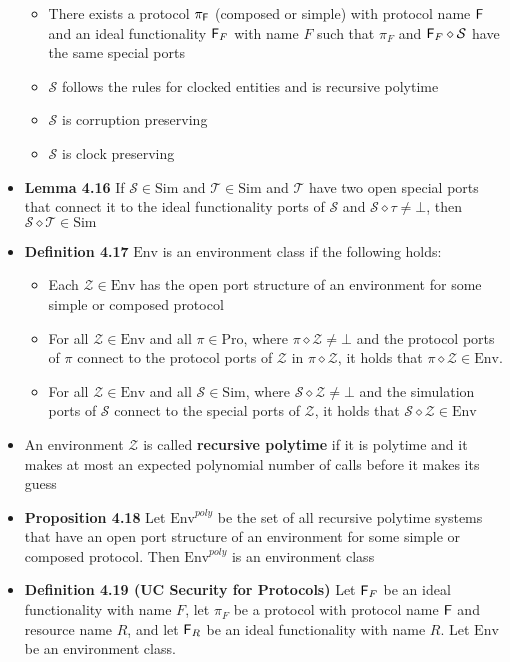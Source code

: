 \begin{itemize}
  \begin{itemize}
  	\item There exists a protocol $\pi_{\mathsf{F}}$ (composed or simple) with protocol name $\mathsf{F}$ and an ideal functionality $\mathsf{F}_{F}$ with name $F$ such that $\pi_{F}$ and $\mathsf{F}_{F} \diamond \mathcal S$ have the same special ports
  	\item $\mathcal S$ follows the rules for clocked entities and is recursive polytime
  	\item $\mathcal S$ is corruption preserving
  	\item $\mathcal S$ is clock preserving
  \end{itemize}
  \item \textbf{Lemma 4.16} If $\mathcal S \in \text{Sim}$ and $\mathcal T \in \text{Sim}$ and $\mathcal T$ have two open special ports that connect it to the ideal functionality ports of $\mathcal S$ and $\mathcal S \diamond \mathcal \tau \neq \bot$, then $\mathcal S \diamond \mathcal T \in \text{Sim}$
  \item \textbf{Definition 4.17} $\text{Env}$ is an environment class if the following holds:
  \begin{itemize}
  	\item Each $\mathcal Z \in \text{Env}$ has the open port structure of an environment for some simple or composed protocol
  	\item For all $\mathcal Z \in \text{Env}$ and all $\pi \in \text{Pro}$, where $\pi \diamond \mathcal Z \neq \bot$ and the protocol ports of $\pi$ connect to the protocol ports of $\mathcal Z$ in $\pi \diamond \mathcal Z$, it holds that $\pi \diamond \mathcal Z \in \text{Env}$.
  	\item For all $\mathcal Z \in \text{Env}$ and all $\mathcal S \in \text{Sim}$, where $\mathcal S \diamond \mathcal Z \neq \bot$ and the simulation ports of $\mathcal S$ connect to the special ports of $\mathcal Z$, it holds that $\mathcal S \diamond \mathcal Z \in \text{Env}$
  \end{itemize}
  \item An environment $\mathcal Z$ is called \textbf{recursive polytime} if it is polytime and it makes at most an expected polynomial number of calls before it makes its guess
  \item \textbf{Proposition 4.18} Let $\text{Env}^{poly}$ be the set of all recursive polytime systems that have an open port structure of an environment for some simple or composed protocol. Then $\text{Env}^{poly}$ is an environment class
  \item \textbf{Definition 4.19 (UC Security for Protocols)} Let $\mathsf{F}_F$ be an ideal functionality with name $F$, let $\pi_F$ be a protocol with protocol name $\mathsf{F}$ and resource name $R$, and let $\mathsf{F}_R$ be an ideal functionality with name $R$. Let $\text{Env}$ be an environment class.

\end{itemize}
